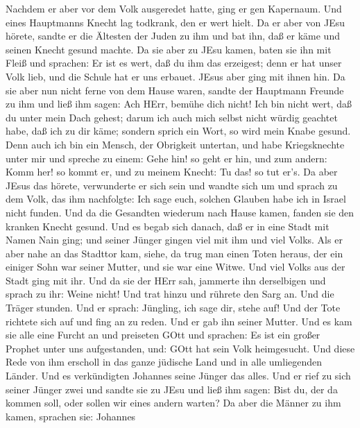  Nachdem er aber vor dem Volk ausgeredet hatte, ging er gen
Kapernaum.  Und eines Hauptmanns Knecht lag todkrank, den er
wert hielt.  Da er aber von JEsu hörete, sandte er die
Ältesten der Juden zu ihm und bat ihn, daß er käme und seinen Knecht
gesund machte.  Da sie aber zu JEsu kamen, baten sie ihn mit
Fleiß und sprachen: Er ist es wert, daß du ihm das erzeigest;
 denn er hat unser Volk lieb, und die Schule hat er uns
erbauet.  JEsus aber ging mit ihnen hin. Da sie aber nun
nicht ferne von dem Hause waren, sandte der Hauptmann Freunde zu ihm und
ließ ihm sagen: Ach HErr, bemühe dich nicht! Ich bin nicht wert, daß du
unter mein Dach gehest;  darum ich auch mich selbst nicht
würdig geachtet habe, daß ich zu dir käme; sondern sprich ein Wort, so
wird mein Knabe gesund.  Denn auch ich bin ein Mensch, der
Obrigkeit untertan, und habe Kriegsknechte unter mir und spreche zu
einem: Gehe hin! so geht er hin, und zum andern: Komm her! so kommt er,
und zu meinem Knecht: Tu das! so tut er's.  Da aber JEsus
das hörete, verwunderte er sich sein und wandte sich um und sprach zu
dem Volk, das ihm nachfolgte: Ich sage euch, solchen Glauben habe ich in
Israel nicht funden.  Und da die Gesandten wiederum nach
Hause kamen, fanden sie den kranken Knecht gesund.  Und es
begab sich danach, daß er in eine Stadt mit Namen Nain ging; und seiner
Jünger gingen viel mit ihm und viel Volks.  Als er aber
nahe an das Stadttor kam, siehe, da trug man einen Toten heraus, der ein
einiger Sohn war seiner Mutter, und sie war eine Witwe. Und viel Volks
aus der Stadt ging mit ihr.  Und da sie der HErr sah,
jammerte ihn derselbigen und sprach zu ihr: Weine nicht! 
Und trat hinzu und rührete den Sarg an. Und die Träger stunden. Und er
sprach: Jüngling, ich sage dir, stehe auf!  Und der Tote
richtete sich auf und fing an zu reden. Und er gab ihn seiner Mutter.
 Und es kam sie alle eine Furcht an und preiseten GOtt und
sprachen: Es ist ein großer Prophet unter uns aufgestanden, und: GOtt
hat sein Volk heimgesucht.  Und diese Rede von ihm erscholl
in das ganze jüdische Land und in alle umliegenden Länder. 
Und es verkündigten Johannes seine Jünger das alles. Und er rief zu sich
seiner Jünger zwei  und sandte sie zu JEsu und ließ ihm
sagen: Bist du, der da kommen soll, oder sollen wir eines andern warten?
 Da aber die Männer zu ihm kamen, sprachen sie: Johannes
